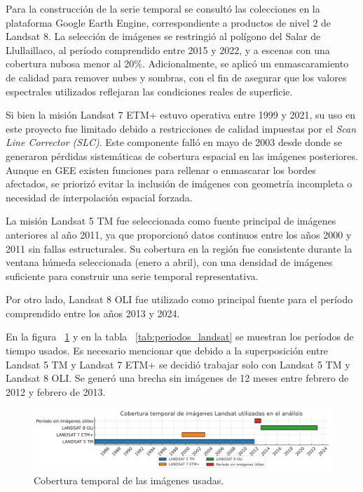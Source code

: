 Para la construcción de la serie temporal se consultó las colecciones en la plataforma Google Earth Engine, correspondiente a productos de nivel 2 de Landsat 8. La selección de imágenes se restringió al polígono del Salar de Llullaillaco, al período comprendido entre 2015 y 2022, y a escenas con una cobertura nubosa menor al 20\%. Adicionalmente, se aplicó un enmascaramiento de calidad para remover nubes y sombras, con el fin de asegurar que los valores espectrales utilizados reflejaran las condiciones reales de superficie.


Si bien la misión Landsat 7 ETM+ estuvo operativa entre 1999 y 2021, su uso en este proyecto fue limitado debido a restricciones de calidad impuestas por el \textit{Scan Line Corrector (SLC)}. Este componente falló en mayo de 2003 desde donde se generaron pérdidas sistemáticas de cobertura espacial en las imágenes posteriores. Aunque en GEE existen funciones para rellenar o enmascarar los bordes afectados, se priorizó evitar la inclusión de imágenes con geometría incompleta o necesidad de interpolación espacial forzada.

La misión Landsat 5 TM fue seleccionada como fuente principal de imágenes anteriores al año 2011, ya que proporcionó datos continuos entre los años 2000 y 2011 sin fallas estructurales. Su cobertura en la región fue consistente durante la ventana húmeda seleccionada (enero a abril), con una densidad de imágenes suficiente para construir una serie temporal representativa.

Por otro lado, Landsat 8 OLI fue utilizado como principal fuente para el período comprendido entre los años 2013 y 2024. 

En la figura ~\ref{fig:cob_temporal} y en la tabla ~\ref{tab:periodos_landsat} se muestran los períodos de tiempo usados. Es necesario mencionar que debido a la superposición entre Landsat 5 TM y Landsat 7 ETM+ se decidió trabajar solo con Landsat 5 TM y Landsat 8 OLI. Se generó una brecha sin imágenes de 12 meses entre febrero de 2012 y febrero de 2013.

\begin{figure}[ht]
        \centering
        \includegraphics[scale=.4]
        {Figures/fig11.png}
        \caption{Cobertura temporal de las imágenes usadas.}
        \label{fig:cob_temporal}
\end{figure}

